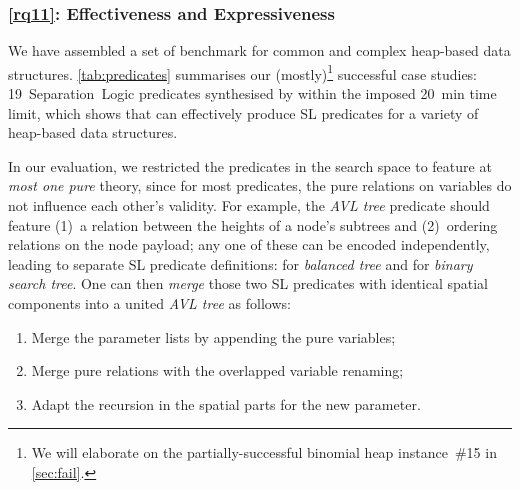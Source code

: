 \subsubsection*{\ref{rq11}: Effectiveness and Expressiveness} 
%
We have assembled a set of benchmark for common and
complex heap-based data structures. \autoref{tab:predicates}
summarises our (mostly)\footnote{We will elaborate on the
  partially-successful binomial heap instance~\#15 in
  \autoref{sec:fail}.} successful case studies: 19~Separation~Logic predicates synthesised by \tool within the imposed 20~min
 time limit, which shows that \tool can effectively
produce SL predicates for a variety of heap-based data structures.

In our evaluation, we restricted the predicates in the search space to
feature at \emph{most one pure} theory, since for most predicates, the pure
relations on variables do not influence each other's validity. For
example, the \emph{AVL tree} predicate should feature (1)~a relation
between the heights of a node's subtrees and (2)~ordering relations on
the node payload; any one of these can be encoded independently,
leading to separate SL predicate definitions: 
for \emph{balanced tree} and  for \emph{binary search
  tree}.
% 
One can then \emph{merge} those two SL predicates with identical
spatial components into a united \emph{AVL tree} 
as follows:
%
\begin{enumerate}[topsep=2pt]
\item Merge the parameter lists by appending the pure variables;
\item Merge pure relations  with the overlapped variable renaming;
\item Adapt the recursion in the spatial parts for the new parameter.
\end{enumerate}


